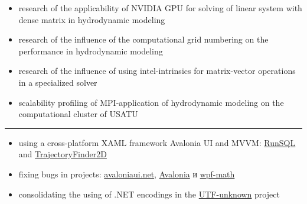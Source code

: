 \documentclass[10pt,a4paper,ragged2e,withhyper]{altacv}
\begin{document}
\begin{paracol}{2}
\begin{itemize}

\item research of the applicability of NVIDIA GPU for
solving of linear system with dense matrix in hydrodynamic modeling
\smallskip

\item research of the influence of the computational grid numbering
\newline on the performance in hydrodynamic modeling
\smallskip

\item research of the influence of using  intel-intrinsics for matrix-vector
\newline operations in a specialized solver
\smallskip

\item scalability profiling of MPI-application of hydrodynamic modeling
\newline on the computational cluster of USATU

\end{itemize}

{\color{headingrule}\rule{\linewidth}{1pt}\par}\medskip


\smallskip

\begin{itemize}

\item using a cross-platform XAML framework
Avalonia UI and MVVM:
\newline \href{https://github.com/rstm-sf/RunSQL}{RunSQL} and
\href{https://github.com/rstm-sf/TrajectoryFinder2D}{TrajectoryFinder2D}
\smallskip

\item fixing bugs in projects:
\href{https://github.com/AvaloniaUI/avaloniaui.net/commits?author=rstm-sf}{avaloniaui.net},
\href{https://github.com/AvaloniaUI/Avalonia/commits?author=rstm-sf}{Avalonia} и
\href{https://github.com/ForNeVeR/wpf-math/commits?author=rstm-sf}{wpf-math}
\smallskip

\item consolidating the using of .NET encodings in the 
\href{https://github.com/CharsetDetector/UTF-unknown/commits?author=rstm-sf}{UTF-unknown} project 

\end{itemize}

\switchcolumn


\end{paracol}
\end{document}

